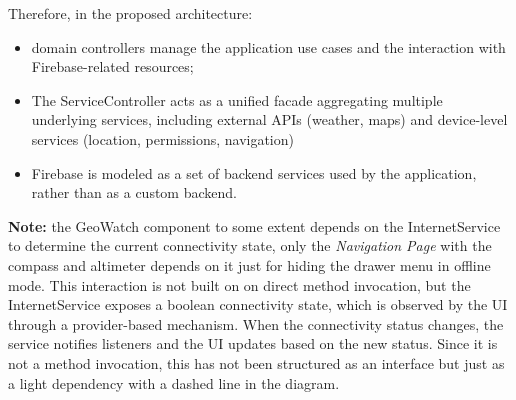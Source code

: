 Therefore, in the proposed architecture:
\begin{itemize}
    \item domain controllers manage the application use cases and the interaction with Firebase-related resources;
    \item The ServiceController acts as a unified facade aggregating multiple underlying services, including external APIs (weather, maps) and device-level services (location, permissions, navigation)
    \item Firebase is modeled as a set of backend services used by the application, rather than as a custom backend.
\end{itemize}

\textbf{Note:} the GeoWatch component to some extent depends on the InternetService to determine the current connectivity state, only the \textit{Navigation Page} with the compass and altimeter depends on it just for hiding the drawer menu in offline mode. This interaction is not built on on direct method invocation, but the InternetService exposes a boolean connectivity state, which is observed by the UI through a provider-based mechanism. When the connectivity status changes, the service notifies listeners and the UI updates based on the new status. Since it is not a method invocation,  this has not been structured as an interface but just as a light dependency with a dashed line in the diagram.


